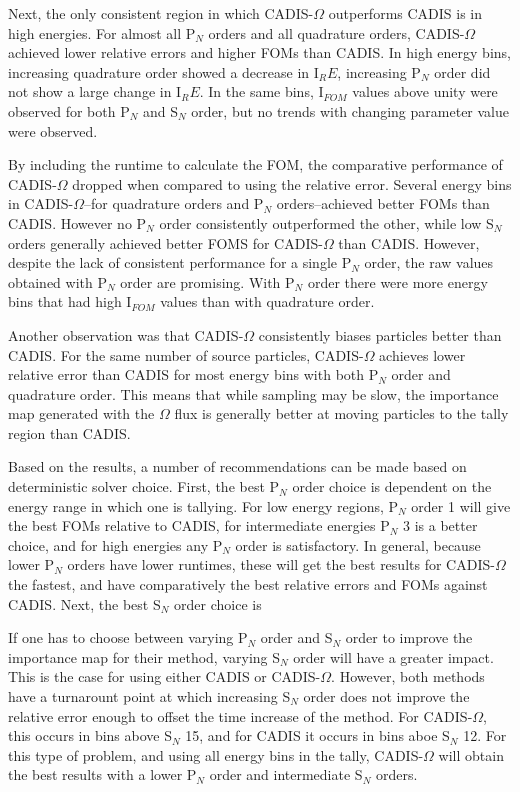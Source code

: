 \documentclass[12pt]{article}
\begin{document}
Next, the only consistent region in which CADIS-$\Omega$ outperforms CADIS is in
high energies. For almost all P$_N$ orders and all quadrature orders, CADIS-$\Omega$
achieved lower relative errors and higher FOMs than CADIS. In high energy bins,
increasing quadrature order showed a decrease in I$_RE$, increasing P$_N$ order
did not show a large change in I$_RE$. In the same bins, I$_{FOM}$ values above
unity were observed for both P$_N$ and S$_N$ order, but no trends with changing
parameter value were observed.

By including the runtime to calculate
the FOM, the comparative performance of CADIS-$\Omega$ dropped when compared to
using the relative error. Several
energy bins in CADIS-$\Omega$--for quadrature orders and
P$_N$ orders--achieved better FOMs than
CADIS. However no P$_N$ order consistently outperformed the other, while low
S$_N$ orders generally achieved better FOMS for CADIS-$\Omega$ than CADIS.
However, despite the lack of consistent performance for a single P$_N$ order,
the raw values obtained with P$_N$ order are promising. With P$_N$ order
there were more energy bins that had high I$_{FOM}$ values than with quadrature
order.

Another observation was
that CADIS-$\Omega$ consistently biases
particles better than CADIS. For the same number of source particles,
CADIS-$\Omega$
achieves lower relative error than CADIS for most energy bins with both P$_N$
order and quadrature order. This means that while sampling may be slow, the
importance map generated with the $\Omega$ flux is generally
better at moving particles to the tally region than
CADIS.

Based on the results, a number of
recommendations can be made based on deterministic solver choice. First, the
best P$_N$ order choice is
dependent on the energy range in which one is tallying. For low energy regions,
P$_N$ order 1 will give the best FOMs relative to CADIS, for intermediate
energies P$_N$ 3 is a better choice, and for high energies any P$_N$ order is
satisfactory. In general, because lower P$_N$ orders have lower runtimes, these
will get the best results for CADIS-$\Omega$ the fastest, and have comparatively
the best relative errors and FOMs against CADIS. Next, the best S$_N$ order
choice is

If one has to choose between varying P$_N$ order and S$_N$ order to improve the
importance map for their method, varying S$_N$ order will have a greater impact.
This is the case for using either CADIS or CADIS-$\Omega$. However, both methods
have a turnarount point at which increasing S$_N$ order does not improve the
relative error enough to offset the time increase of the method. For
CADIS-$\Omega$, this occurs in bins above S$_N$ 15, and for CADIS it occurs in
bins aboe S$_N$ 12. For this type of problem, and using all energy bins in the
tally, CADIS-$\Omega$ will obtain the
best results with a lower P$_N$ order and intermediate S$_N$ orders.
\end{document}
